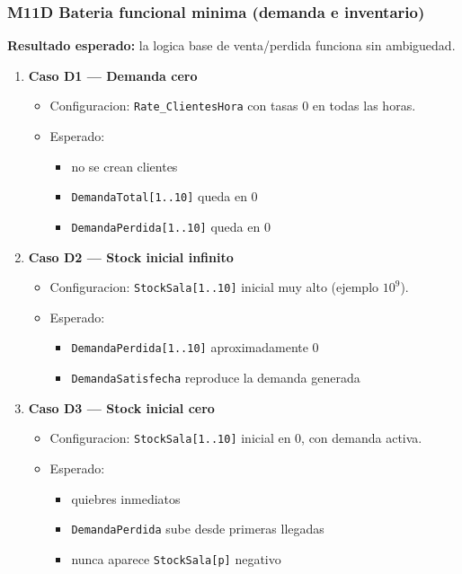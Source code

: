 \documentclass[11pt]{article}
\newcommand{\tabla}[1]{\texttt{#1}}
\newcommand{\state}[1]{\texttt{#1}}
\begin{document}
\subsubsection{M11D Bateria funcional minima (demanda e inventario)}
\textbf{Resultado esperado:} la logica base de venta/perdida funciona sin ambiguedad.

\begin{enumerate}
  \item \textbf{Caso D1 --- Demanda cero}
  \begin{itemize}
    \item Configuracion: \tabla{Rate\_ClientesHora} con tasas 0 en todas las horas.
    \item Esperado:
    \begin{itemize}
      \item no se crean clientes
      \item \state{DemandaTotal[1..10]} queda en 0
      \item \state{DemandaPerdida[1..10]} queda en 0
    \end{itemize}
  \end{itemize}
  \item \textbf{Caso D2 --- Stock inicial infinito}
  \begin{itemize}
    \item Configuracion: \state{StockSala[1..10]} inicial muy alto (ejemplo \(10^9\)).
    \item Esperado:
    \begin{itemize}
      \item \state{DemandaPerdida[1..10]} aproximadamente 0
      \item \state{DemandaSatisfecha} reproduce la demanda generada
    \end{itemize}
  \end{itemize}
  \item \textbf{Caso D3 --- Stock inicial cero}
  \begin{itemize}
    \item Configuracion: \state{StockSala[1..10]} inicial en 0, con demanda activa.
    \item Esperado:
    \begin{itemize}
      \item quiebres inmediatos
      \item \state{DemandaPerdida} sube desde primeras llegadas
      \item nunca aparece \state{StockSala[p]} negativo
    \end{itemize}

\end{itemize}
\end{enumerate}
\end{document}
